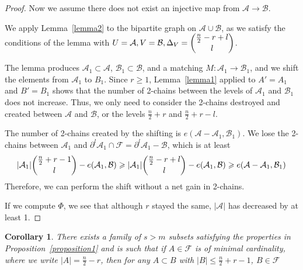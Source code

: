 \documentclass[12pt]{article}
\theoremstyle{plain}
\newtheorem{corollary}[theorem]{Corollary}
\theoremstyle{definition}
\theoremstyle{remark}
\newcommand{\F}{\mathcal{F}}
\newcommand{\A}{\mathcal{A}}
\newcommand{\B}{\mathcal{B}}
\begin{document}
\begin{proof}

Now we assume there does not exist an injective map from $\A \rightarrow \B$.

We apply Lemma~\ref{lemma2} to the bipartite graph on $\A \cup \B$, as we satisfy the conditions of the lemma with $U = \A, V = \B, \Delta_V = \dbinom{\frac{n}{2} - r + l}{l}$.

The lemma produces $\A_1 \subset \A$, $\B_1 \subset \B$, and a matching $M:\A_1 \rightarrow \B_1$, and we shift the elements from $\A_1$ to $B_1$. Since $r \geq 1$, Lemma~\ref{lemma1} applied to $A' = A_1$ and $B' = B_1$ shows that the number of 2-chains between the levels of $\A_1$ and $\B_1$ does not increase. Thus, we only need to consider the 2-chains destroyed and created between $\A$ and $\B$, or the levels $\frac{n}{2} + r$ and $\frac{n}{2} + r - l$.

The number of 2-chains created by the shifting is $e(\A - \A_1, \B_1)$. We lose the 2-chains between $\A_1$ and $\partial^l\A_1 \cap \F = \partial^l\A_1 - \B$, which is at least
\[ |\A_1|\dbinom{\frac{n}{2}+r-1}{l} - e(\A_1, \B) \geq |\A_1|\dbinom{\frac{n}{2} - r + l}{l} - e(\A_1, \B) \geq e(\A - \A_1, \B_1) \] 
Therefore, we can perform the shift without a net gain in 2-chains.

If we compute $\Phi$, we see that although $r$ stayed the same, $|\A|$ has decreased by at least 1.
\end{proof}

\begin{corollary}
\label{cor1}
There exists a family of $s > m$ subsets satisfying the properties in Proposition~\ref{proposition1} and is such that if $A \in \F$ is of minimal cardinality, where we write $|A|=\frac{n}{2}-r$, then for any $A \subset B$ with $|B| \leq \frac{n}{2}+r-1$, $B \in \F$
\end{corollary}
\end{document}
